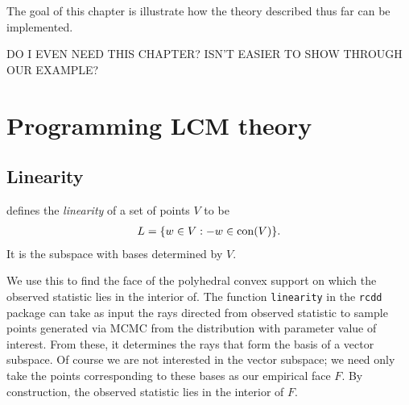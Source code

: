 The goal of this chapter is illustrate how the theory described thus far can be implemented.

DO I EVEN NEED THIS CHAPTER?  ISN'T EASIER TO SHOW THROUGH OUR EXAMPLE?

\section{Programming LCM theory}
 \citep{rcdd}

\subsection{Linearity}\label{S:linearity}
\citet{Geyer:gdor} defines the \emph{linearity} of a set of points $V$ to be
\begin{align*}
	L = \{ w \in V: -w \in \operatorname{con}( V ) \}.
\end{align*}
It is the subspace with bases determined by $V$.

We use this to find the face of the polyhedral convex support on which the observed 
statistic lies in the interior of.  The function \texttt{linearity} in the \texttt
{rcdd} package can take as input the rays directed from observed statistic to sample 
points generated via MCMC from the distribution with parameter value of interest.  
From these, it determines the rays that form the basis of a vector subspace.  Of 
course we are not interested in the vector subspace; we need only take the points 
corresponding to these bases as our empirical face $F$.  By construction, the observed 
statistic lies in the interior of $F$.





